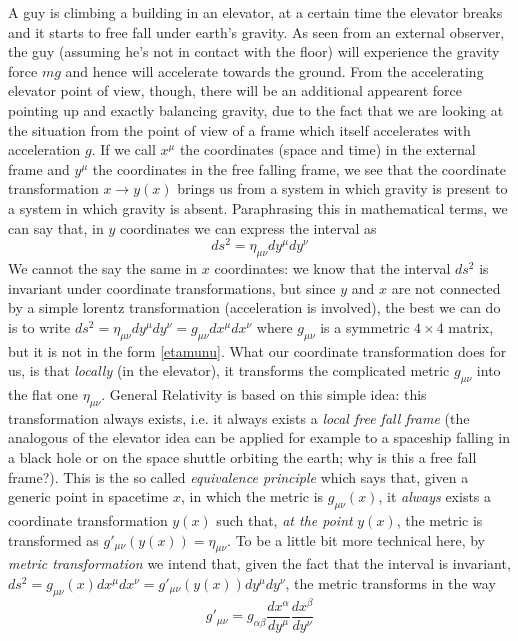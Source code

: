 A guy is climbing a building in an elevator, at a certain time the elevator breaks and it starts to free fall under earth's gravity. As seen from an external observer, the guy (assuming he's not in contact with the floor) will experience the gravity force $mg$ and hence will accelerate towards the ground. From the accelerating elevator point of view, though, there will be an additional appearent force pointing up and exactly balancing gravity, due to the fact that we are looking at the situation from the point of view of a frame which itself accelerates with acceleration $g$. If we call $x^\mu$ the coordinates (space and time) in the external frame and $y^\mu$ the coordinates in the free falling frame, we see that the coordinate transformation $x\rightarrow y(x)$ brings us from a system in which gravity is present to a system in which gravity is absent. Paraphrasing this in mathematical terms, we can say that, in $y$ coordinates we can express the interval as
\begin{equation}
ds^2=\eta_{\mu\nu}dy^\mu dy^\nu
\end{equation}
We cannot the say the same in $x$ coordinates: we know that the interval $ds^2$ is invariant under coordinate transformations, but since $y$ and $x$ are not connected by a simple lorentz transformation (acceleration is involved), the best we can do is to write $ds^2=\eta_{\mu\nu}dy^\mu dy^\nu=g_{\mu\nu}dx^\mu dx^\nu$ where $g_{\mu\nu}$ is a symmetric $4\times4$ matrix, but it is not in the form \ref{etamunu}. What our coordinate transformation does for us, is that \textit{locally} (in the elevator), it transforms the complicated metric $g_{\mu\nu}$ into the flat one $\eta_{\mu\nu}$. General Relativity is based on this simple idea: this transformation always exists, i.e. it always exists a \textit{local free fall frame} (the analogous of the elevator idea can be applied for example to a spaceship falling in a black hole or on the space shuttle orbiting the earth; why is this a free fall frame?). This is the so called \textit{equivalence principle} which says that, given a generic point in spacetime $x$, in 
which the metric is $g_{\mu\nu}(x)$, it \textit{always} exists a coordinate transformation $y(x)$ such that, \textit{at the point} $y(x)$, the metric is transformed as $g'_{\mu\nu}(y(x))=\eta_{\mu\nu}$. To be a little bit more technical here, by \textit{metric transformation} we intend that, given the fact that the interval is invariant, $ds^2=g_{\mu\nu}(x)dx^\mu dx^\nu=g'_{\mu\nu}(y(x))dy^\mu dy^\nu$, the metric transforms in the way
\begin{equation}
g'_{\mu\nu}=g_{\alpha\beta}\frac{dx^\alpha}{dy^\mu}\frac{dx^\beta}{dy^\nu}
\end{equation}
